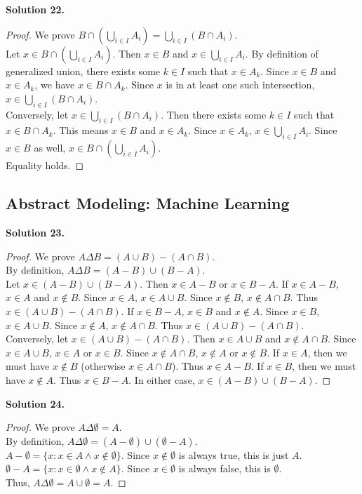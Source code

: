 \documentclass[11pt]{article}
\begin{document}
\noindent \textbf{Solution 22.}
\begin{proof}
We prove $B \cap \left(\bigcup_{i \in I} A_i\right) = \bigcup_{i \in I} (B \cap A_i)$. \\
Let $x \in B \cap \left(\bigcup_{i \in I} A_i\right)$. Then $x \in B$ and $x \in \bigcup_{i \in I} A_i$. By definition of generalized union, there exists some $k \in I$ such that $x \in A_k$. Since $x \in B$ and $x \in A_k$, we have $x \in B \cap A_k$. Since $x$ is in at least one such intersection, $x \in \bigcup_{i \in I} (B \cap A_i)$. \\
Conversely, let $x \in \bigcup_{i \in I} (B \cap A_i)$. Then there exists some $k \in I$ such that $x \in B \cap A_k$. This means $x \in B$ and $x \in A_k$. Since $x \in A_k$, $x \in \bigcup_{i \in I} A_i$. Since $x \in B$ as well, $x \in B \cap \left(\bigcup_{i \in I} A_i\right)$. \\
Equality holds.
\end{proof}

\subsection{Abstract Modeling: Machine Learning}

\noindent \textbf{Solution 23.}
\begin{proof}
We prove $A \Delta B = (A \cup B) - (A \cap B)$. \\
By definition, $A \Delta B = (A - B) \cup (B - A)$. \\
Let $x \in (A - B) \cup (B - A)$. Then $x \in A - B$ or $x \in B - A$. 
If $x \in A - B$, $x \in A$ and $x \notin B$. Since $x \in A$, $x \in A \cup B$. Since $x \notin B$, $x \notin A \cap B$. Thus $x \in (A \cup B) - (A \cap B)$. 
If $x \in B - A$, $x \in B$ and $x \notin A$. Since $x \in B$, $x \in A \cup B$. Since $x \notin A$, $x \notin A \cap B$. Thus $x \in (A \cup B) - (A \cap B)$. \\
Conversely, let $x \in (A \cup B) - (A \cap B)$. Then $x \in A \cup B$ and $x \notin A \cap B$. Since $x \in A \cup B$, $x \in A$ or $x \in B$. Since $x \notin A \cap B$, $x \notin A$ or $x \notin B$. 
If $x \in A$, then we must have $x \notin B$ (otherwise $x \in A \cap B$). Thus $x \in A - B$. 
If $x \in B$, then we must have $x \notin A$. Thus $x \in B - A$. 
In either case, $x \in (A - B) \cup (B - A)$.
\end{proof}

\noindent \textbf{Solution 24.}
\begin{proof}
We prove $A \Delta \emptyset = A$. \\
By definition, $A \Delta \emptyset = (A - \emptyset) \cup (\emptyset - A)$. \\
$A - \emptyset = \{x : x \in A \land x \notin \emptyset\}$. Since $x \notin \emptyset$ is always true, this is just $A$. \\
$\emptyset - A = \{x : x \in \emptyset \land x \notin A\}$. Since $x \in \emptyset$ is always false, this is $\emptyset$. \\
Thus, $A \Delta \emptyset = A \cup \emptyset = A$.
\end{proof}
\end{document}
